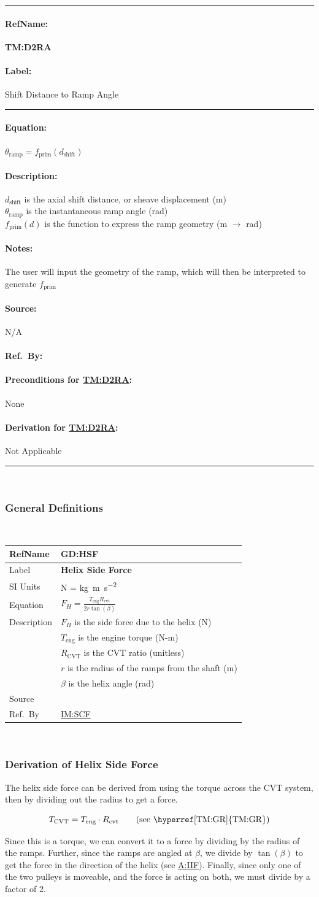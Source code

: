\documentclass[12pt]{article}
\newcommand{\colAwidth}{0.13\textwidth}
\newcommand{\colBwidth}{0.82\textwidth}
\newcommand{\hpref}[1]{\hyperref[#1]{#1}}
\newcommand{\deftheory}[9][Not Applicable]
{
\newpage
\noindent \rule{\textwidth}{0.5mm}

\paragraph{RefName: } \textbf{#2} \phantomsection 
\label{#2}

\paragraph{Label:} #3

\noindent \rule{\textwidth}{0.5mm}

\paragraph{Equation:}

#4

\paragraph{Description:}

#5

\paragraph{Notes:}

#6

\paragraph{Source:}

#7

\paragraph{Ref.\ By:}

#8

\paragraph{Preconditions for \hpref{#2}:}
\label{#2_precond}

#9

\paragraph{Derivation for \hpref{#2}:}
\label{#2_deriv}

#1

\noindent \rule{\textwidth}{0.5mm}

}
\newcommand{\defgeneral}[7] {
~\newline
\noindent
\begin{minipage}{\textwidth}
\renewcommand*{\arraystretch}{1.5}
\begin{tabular}{| p{\colAwidth} | p{\colBwidth}|}
  \hline
  \rowcolor[gray]{0.9}
  RefName& \textbf{#1} \label{#1}\\
  \hline
  Label& \bf #2 \\
  \hline
  SI Units& #3\\
  \hline
  Equation& #4\\
  \hline
  Description& #5 \\
  \hline
  Source& #6 \\
  \hline
  Ref.\ By & #7\\
  \hline
\end{tabular}
\end{minipage}\\
}
\begin{document}
\noindent
\deftheory
{TM:D2RA}%
{Shift Distance to Ramp Angle}%
{$\theta_\text{ramp} = f_\text{prim}(d_\text{shift})$}%
{$d_\text{shift}$ is the axial shift distance, or sheave displacement (m)\\
$\theta_\text{ramp}$ is the instantaneous ramp angle (rad)\\
$f_\text{prim}(d)$ is the function to express the ramp geometry (m $\rightarrow$ rad)}%
{The user will input the geometry of the ramp, which will then be interpreted to generate $f_\text{prim}$}%
{N/A}%
{}%
{None}%
{}%

~\newline

\subsubsection{General Definitions}\label{sec_gendef}

\defgeneral
{GD:HSF}
{Helix Side Force} %
{N = \si{\kilogram \metre\per\square\second}} %
{$F_H = \frac{T_\text{eng} R_\text{cvt}}{2r\tan(\beta)}$} %
{$F_H$ is the side force due to the helix (N) \\
& $T_{\text{eng}}$ is the engine torque (N-m) \\
& $R_{\text{CVT}}$ is the CVT ratio (unitless) \\
& $r$ is the radius of the ramps from the shaft (m) \\
& $\beta$ is the helix angle (rad)} %
{} %
{\hpref{IM:SCF}} %

\subsubsection*{Derivation of Helix Side Force}
The helix side force can be derived from using the torque across the CVT system, then by dividing out the radius to get a force.

\[ T_\text{CVT} = T_\text{eng} \cdot R_\text{cvt} \tag*{\text{(see \hyperref[TM:GR]{TM:GR})}}\]

Since this is a torque, we can convert it to a force by dividing by the radius of the ramps. Further, since the ramps are angled at $\beta$, we divide by $\tan(\beta)$ to get the force in the direction of the helix (see \hpref{A:IIF}). Finally, since only one of the two pulleys is moveable, and the force is acting on both, we must divide by a factor of 2.
\end{document}
